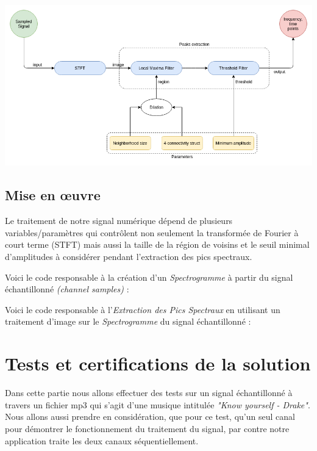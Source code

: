 \documentclass[11pt, report, french]{scrreprt}
\begin{document}
\begin{center}
	\includegraphics[scale=0.5]{img/dsp_algorithm.png}
\end{center}

\subsection{Mise en œuvre}
Le traitement de notre signal numérique dépend de plusieurs variables/paramètres qui contrôlent non seulement la transformée de Fourier à court terme (STFT) mais aussi la taille de la région de voisins et le seuil minimal d'amplitudes à considérer pendant l'extraction des pics spectraux.\\\par

Voici le code responsable à la création d'un \textit{Spectrogramme} à partir du signal échantillonné \textit{(channel samples)} :



\vspace{1cm}
Voici le code responsable à l'\textit{Extraction des Pics Spectraux} en utilisant un traitement d'image sur le \textit{Spectrogramme} du signal échantillonné :




\section{Tests et certifications de la solution}
Dans cette partie nous allons effectuer des tests sur un signal échantillonné à travers un fichier mp3 qui s'agit d'une musique intitulée \textit{"Know yourself - Drake"}. Nous allons aussi prendre en considération, que pour ce test, qu'un seul canal pour démontrer le fonctionnement du traitement du signal, par contre notre application traite les deux canaux séquentiellement.\\\par
\end{document}
